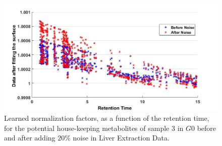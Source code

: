 \begin{figure}
	
	\centering
	\includegraphics[width=1\textwidth]{RT-data_surfaceOfS3}
	\caption{Learned normalization factors, as a function of the retention time, for the potential house-keeping metabolites of sample 3 in $G0$ before and after adding $20\%$ noise in Liver Extraction Data.}
	\label{RT-data_surfaceOfS3}
\end{figure}



